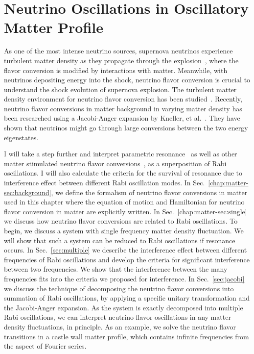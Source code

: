 
\chapter{\label{chap:matter}Neutrino Oscillations in Oscillatory Matter Profile}


As one of the most intense neutrino sources, supernova neutrinos experience turbulent matter density as they propagate through the explosion~\cite{Muller2015, Couch2015}, where the flavor conversion is modified by interactions with matter. Meanwhile, with neutrinos depositing energy into the shock, neutrino flavor conversion is crucial to understand the shock evolution of supernova explosion. The turbulent matter density environment for neutrino flavor conversion has been studied~\cite{Loreti1994, Friedland2006,Kneller2010}. Recently, neutrino flavor conversions in matter background in varying matter density has been researched using a Jacobi-Anger expansion by Kneller, et al.~\cite{Kneller2013,Patton2014}. They have shown that neutrinos might go through large conversions between the two energy eigenstates.



I will take a step further and interpret parametric resonance~\cite{Akhmedov2000, Krastev1989} as well as other matter stimulated neutrino flavor conversions~\cite{Kneller2013, Patton2014}, as a superposition of Rabi oscillations. I will also calculate the criteria for the survival of resonance due to interference effect between different Rabi oscillation modes. In Sec.~\ref{chap:matter-sec:background}, we define the formalism of neutrino flavor conversions in matter used in this chapter where the equation of motion and Hamiltonian for neutrino flavor conversion in matter are explicitly written. In Sec.~\ref{chap:matter-sec:single} we discuss how neutrino flavor conversions are related to Rabi oscillations. To begin, we discuss a system with single frequency matter density fluctuation. We will show that such a system can be reduced to Rabi oscillations if resonance occurs. In Sec.~\ref{sec:multiple} we describe the interference effect between different frequencies of Rabi oscillations and develop the criteria for significant interference between two frequencies. We show that the interference between the many frequencies fits into the criteria we proposed for interference. In Sec.~\ref{sec:jacobi} we discuss the technique of decomposing the neutrino flavor conversions into summation of Rabi oscillations, by applying a specific unitary transformation and the Jacobi-Anger expansion. As the system is exactly decomposed into multiple Rabi oscillations, we can interpret neutrino flavor oscillations in any matter density fluctuations, in principle. As an example, we solve the neutrino flavor transitions in a castle wall matter profile, which contains infinite frequencies from the aspect of Fourier series.




